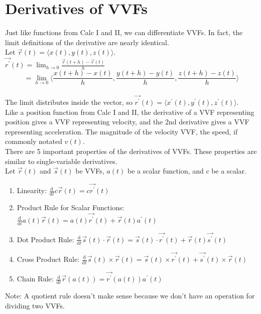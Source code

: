 \section{Derivatives of VVFs}
\noindent
Just like functions from Calc I and II, we can differentiate VVFs. In fact, the limit definitions of the derivative are nearly identical.\\
Let $\vec{r}(t)=\langle x(t), y(t), z(t) \rangle$.\\
$\vec{r^\prime}(t)=\lim_{h\to 0}{\frac{\vec{r}(t+h)-\vec{r}(t)}{h}}$\\
$$=\lim_{h\to 0}{\langle \frac{x(t+h)-x(t)}{h}, \frac{y(t+h)-y(t)}{h}, \frac{z(t+h)-z(t)}{h} \rangle}$$\\
The limit distributes inside the vector, so $\vec{r^\prime}(t)=\langle x^{\prime}(t), y^{\prime}(t), z^{\prime}(t) \rangle$.\\

\noindent
Like a position function from Calc I and II, the derivative of a VVF representing position gives a VVF representing velocity, and the 2nd derivative gives a VVF representing acceleration. The magnitude of the velocity VVF, the speed, if commonly notated $v(t)$.\\

\noindent
There are 5 important properties of the derivatives of VVFs. These properties are similar to single-variable derivatives.\\
Let $\vec{r}(t)$ and $\vec{s}(t)$ be VVFs, $a(t)$ be a scalar function, and $c$ be a scalar.\\
\begin{enumerate}
	\item Linearity: $\frac{\mathrm{d}}{\mathrm{d}t}c\vec{r}(t)=c\vec{r^\prime}(t)$
	\item Product Rule for Scalar Functions: $\frac{\mathrm{d}}{\mathrm{d}t}a(t)\vec{r}(t)=a(t)\vec{r^\prime}(t)+\vec{r}(t)a^{\prime}(t)$
	\item Dot Product Rule: $\frac{\mathrm{d}}{\mathrm{d}t}\vec{s}(t)\cdot\vec{r}(t)=\vec{s}(t)\cdot\vec{r^\prime}(t)+\vec{r}(t)\vec{s^\prime}(t)$
	\item Cross Product Rule: $\frac{\mathrm{d}}{\mathrm{d}t}\vec{s}(t)\times\vec{r}(t)=\vec{s}(t)\times\vec{r^\prime}(t)+\vec{s^\prime}(t)\times\vec{r}(t)$
	\item Chain Rule: $\frac{\mathrm{d}}{\mathrm{d}t}\vec{r}(a(t))=\vec{r^\prime}(a(t))a^{\prime}(t)$
\end{enumerate}
\small{Note: A quotient rule doesn't make sense because we don't have an operation for dividing two VVFs.}

